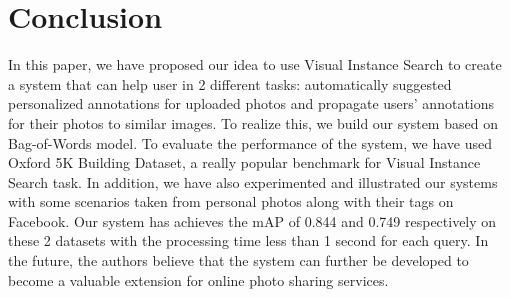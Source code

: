 \section{Conclusion}
\label{section:conclusion}

In this paper, we have proposed our idea to use Visual Instance Search to create a system that can help user in 2 different tasks: automatically suggested personalized annotations for uploaded photos and propagate users' annotations for their photos to similar images. To realize this, we build our system based on Bag-of-Words model. To evaluate the performance of the system, we have used Oxford 5K Building Dataset, a really popular benchmark for Visual Instance Search task. In addition, we have also experimented and illustrated our systems with some scenarios taken from personal photos along with their tags on Facebook. Our system has achieves the mAP of 0.844 and 0.749 respectively on these 2 datasets with the processing time less than 1 second for each query. In the future, the authors believe that the system can further be developed to become a valuable extension for online photo sharing services. 

